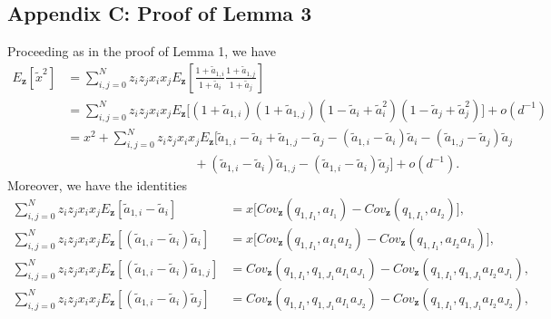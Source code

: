\documentclass[11pt]{article}
\begin{document}
\subsection*{Appendix C: Proof of Lemma 3  }
Proceeding as in the proof of Lemma 1, we have
\begin{align}\label{sec2-eq20}
E_{\mathbf{z}}\left[\tilde{x}^2\right]&=\sum_{i,j=0}^{N}z_iz_jx_ix_jE_{\mathbf{z}}\left[\frac{1+\tilde{a}_{1,i}}{1+\tilde{a}_{i}}\frac{1+\tilde{a}_{1,j}}{1+\tilde{a}_{j}}\right]\nonumber\\
&=\sum_{i,j=0}^{N}z_iz_jx_ix_jE_{\mathbf{z}}\Big[\left(1+\tilde{a}_{1,i}\right)\left(1+\tilde{a}_{1,j}\right)\left(1-\tilde{a}_{i}+\tilde{a}_{i}^2\right)\left(1-\tilde{a}_{j}+\tilde{a}_{j}^2\right)\Big]+o(d^{-1})\nonumber\\
&=x^2+\sum_{i,j=0}^{N}z_iz_jx_ix_j
E_{\mathbf{z}}\Big[\tilde{a}_{1,i}-\tilde{a}_{i}+\tilde{a}_{1,j}-\tilde{a}_{j}-\left(\tilde{a}_{1,i}-\tilde{a}_{i}\right)\tilde{a}_{i}-\left(\tilde{a}_{1,j}-\tilde{a}_{j}\right)\tilde{a}_{j}\nonumber\\
&\quad\quad\quad\quad\quad\quad\quad\quad\quad\quad+\left(\tilde{a}_{1,i}-\tilde{a}_{i}\right)\tilde{a}_{1,j}-\left(\tilde{a}_{1,i}-\tilde{a}_{i}\right)\tilde{a}_{j}\Big]
+o(d^{-1}).
\end{align}
Moreover, we have the identities 
\begin{subequations}\label{sec2-eq21}
\begin{align}
\sum_{i,j=0}^{N}z_iz_jx_ix_jE_{\mathbf{z}}\left[\tilde{a}_{1,i}-\tilde{a}_{i}\right]
&=x\Big[Cov_{\mathbf{z}}\left(q_{1,I_1},a_{I_1}\right)-Cov_{\mathbf{z}}\left(q_{1,I_1},a_{I_2}\right)\Big],\\
\sum_{i,j=0}^{N}z_iz_jx_ix_jE_{\mathbf{z}}\left[(\tilde{a}_{1,i}-\tilde{a}_{i})\tilde{a}_{i}\right]
&=x\Big[Cov_{\mathbf{z}}\left(q_{1,I_1},a_{I_1}a_{I_2}\right)-Cov_{\mathbf{z}}\left(q_{1,I_1},a_{I_2}a_{I_3}\right)\Big],\\
\sum_{i,j=0}^{N}z_iz_jx_ix_jE_{\mathbf{z}}\left[(\tilde{a}_{1,i}-\tilde{a}_{i})\tilde{a}_{1,j}\right]
&=Cov_{\mathbf{z}}\left(q_{1,I_1},q_{1,J_1}a_{I_1}a_{J_1}\right)-Cov_{\mathbf{z}}\left(q_{1,I_1},q_{1,J_1}a_{I_2}a_{J_1}\right),\\
\sum_{i,j=0}^{N}z_iz_jx_ix_jE_{\mathbf{z}}\left[(\tilde{a}_{1,i}-\tilde{a}_{i})\tilde{a}_{j}\right]
&=Cov_{\mathbf{z}}\left(q_{1,I_1},q_{1,J_1}a_{I_1}a_{J_2}\right)-Cov_{\mathbf{z}}\left(q_{1,I_1},q_{1,J_1}a_{I_2}a_{J_2}\right),
\end{align}
\end{subequations}
\end{document}
